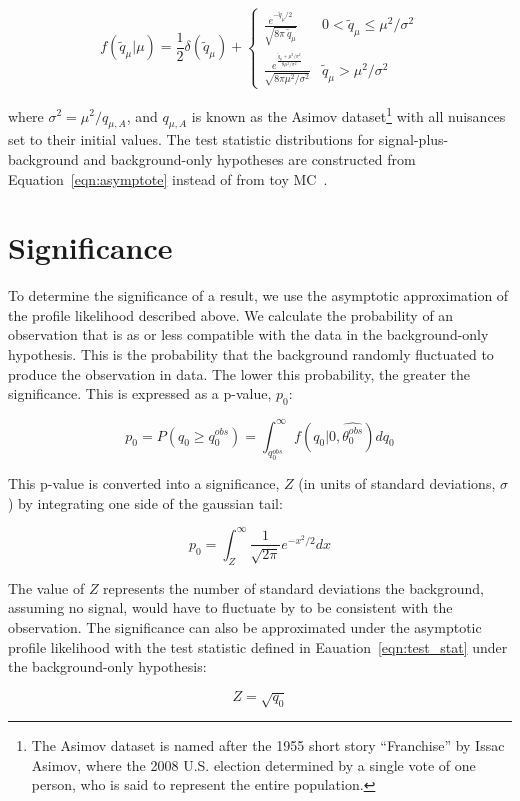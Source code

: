 \begin{equation}
\label{eqn:asymptote}
f(\tilde{q}_{\mu}|\mu) = \frac{1}{2}\delta(\tilde{q}_{\mu}) + \begin{cases}
  \frac{e^{-\tilde{q}_{\mu}/2}}{\sqrt{8\pi~\tilde{q}_{\mu}}} & 0 < \tilde{q}_{\mu} \leq \mu^{2}/\sigma^{2} \\
  \frac{e^{\frac{\tilde{q}_{\mu}+\mu^{2}/\sigma^{2}}{8\mu^{2}/\sigma^{2}}}}{\sqrt{8\pi\mu^{2}/\sigma^{2}}} & \tilde{q}_{\mu} > \mu^{2}/\sigma^{2}
  \end{cases}
\end{equation}

\noindent where $\sigma^{2} = \mu^{2}/q_{\mu,A}$, and $q_{\mu,A}$ is known as the Asimov dataset\footnote{The Asimov dataset is named after the 1955 short story ``Franchise'' by Issac Asimov, where the 2008
U.S. election determined by a single vote of one person, who is said to represent the entire population.} with all nuisances set to their initial values. The test statistic distributions for
signal-plus-background and background-only hypotheses are constructed from Equation~\ref{eqn:asymptote} instead of from toy MC~\cite{CMS-AN-11-298}. 

\section{Significance}
To determine the significance of a result, we use the asymptotic approximation of the profile likelihood described above. We calculate the probability of an observation that is as or less compatible with the
data in the background-only hypothesis. This is the probability that the background randomly fluctuated to produce the observation in data. The lower this probability, the greater the significance.
This is expressed as a p-value, $p_{0}$:

\begin{equation}
\label{eqn:signif1}
p_{0} = P(q_{0} \geq q_{0}^{obs}) = \int_{q_{0}^{obs}}^{\infty} f(q_{0}|0,\hat{\theta_{0}^{obs}}) dq_{0}
\end{equation}

\noindent This p-value is converted into a significance, $Z$ (in units of standard deviations, $\sigma$) by integrating one side of the gaussian tail:

\begin{equation}
\label{eqn:signif2}
p_{0} = \int_{Z}^{\infty} \frac{1}{\sqrt{2\pi}}e^{-x^{2}/2} dx
\end{equation}

\noindent The value of $Z$ represents the number of standard deviations the background, assuming no signal, would have to fluctuate by to be consistent with the observation. 
The significance can also be approximated under the asymptotic profile likelihood with the test statistic defined in Eauation~\ref{eqn:test_stat} under the background-only hypothesis:

\begin{equation}
\label{eqn:signif3}
Z = \sqrt{q_{0}}
\end{equation}
